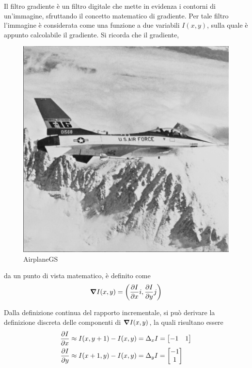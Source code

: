 \documentclass{subfiles}
\begin{document}
Il filtro gradiente è un filtro digitale che mette in evidenza i contorni di un'immagine, sfruttando il concetto matematico di gradiente.
Per tale filtro l'immagine è considerata come una funzione a due variabili \(I(x,y)\), sulla quale è appunto calcolabile il gradiente.
Si ricorda che il gradiente,
\begin{figure}
    \centering
    \includegraphics[scale = 0.325]{../Images/Airplane/AirplaneGS.png}
    \caption{AirplaneGS}
    \label{fig:4.8}
\end{figure}
da un punto di vista matematico, è definito come
\[
    \grad{I(x,y)} = \left(\pdv{I}{x} i, \pdv{I}{y} j\right)
\]

Dalla definizione continua del rapporto incrementale, si può derivare la definizione discreta delle componenti di \(\grad{I(x, y)}\), la quali risultano essere
\[\begin{aligned}
        \pdv{I}{x} & \approx I(x, y+1) - I(x, y) = \Delta_{x}I = \begin{bmatrix}
                                                                     -1 & 1 \\
                                                                 \end{bmatrix}   \\
        \pdv{I}{y} & \approx I(x + 1, y) - I(x, y) = \Delta_{y}I = \begin{bmatrix}
                                                                       -1 \\
                                                                       1  \\
                                                                   \end{bmatrix}
    \end{aligned}\]
\end{document}
